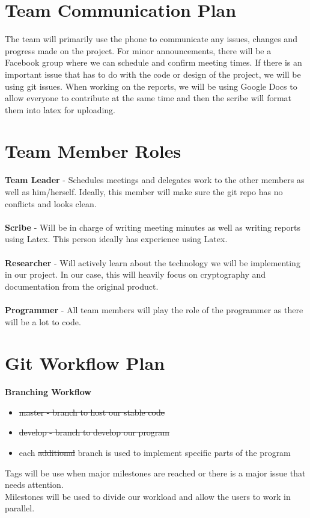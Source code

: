 \documentclass{article}
\begin{document}
\section{Team Communication Plan}

The team will primarily use the phone to communicate any issues, changes and progress made on the project. For minor announcements, there will be a Facebook group where we can schedule and confirm meeting times. If there is an important issue that has to do with the code or design of the project, we will be using git issues. When working on the reports, we will be using Google Docs to allow everyone to contribute at the same time and then the scribe will format them into latex for uploading.

\newpage

\section{Team Member Roles}

\textbf{Team Leader} - Schedules meetings and delegates work to the other members as well as him/herself. Ideally, this member will make sure the git repo has no conflicts and looks clean.\\\\
\textbf{Scribe} - Will be in charge of writing meeting minutes as well as writing reports using Latex. This person ideally has experience using Latex.\\\\
\textbf{Researcher} - Will actively learn about the technology we will be implementing in our project. In our case, this will heavily focus on cryptography and documentation from the original product.\\\\
\textbf{Programmer} - All team members will play the role of the programmer as there will be a lot to code.

\section{Git Workflow Plan}

\textbf{Branching Workflow}
\begin{itemize}
    \item \sout{master - branch to host our stable code}
    \item \sout{develop - branch to develop our program}
    \item each \sout{additional} branch is used to implement specific parts of the program
\end{itemize}
Tags will be use when major milestones are reached or there is a major issue that needs attention.\\
Milestones will be used to divide our workload and allow the users to work in parallel.
\end{document}
